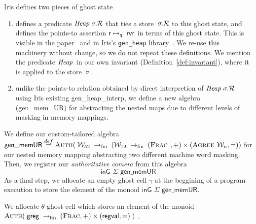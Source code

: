 \begin{assumption}
\label{assumption}
Iris defines two pieces of ghost state
\begin{enumerate}
\item  defines a predicate $\mathit{Heap}\;\sigma.\mathcal{R}$
  that ties a store~$\sigma.\mathcal{R}$ to this ghost state,
  and defines the points-to assertion $\mathsf{r}\mapsto_{\mathsf{q}}\;\mathsf{rv}\mathsf{r}$
  in terms of this ghost state.
  This is visible in the paper~\cite[\S6.3.2]{iris}
  and in Iris's \texttt{gen\_heap} library~\cite{genheap}.
  We re-use this machinery without change,
  so we do not repeat these definitions.
  We mention the predicate $\mathit{Heap}\;\!$
  in our own invariant (Definition~\ref{def:invariant}),
  where it is applied to the \logical store~$\sigma$.
\item unlike the points-to relation obtained by direct interpretion of $\mathit{Heap}\;\sigma.\mathcal{R}$ using Iris existing \textsf{gen\_heap\_interp},
  we define a new algebra (\textsf{gen\_mem\_UR}) for abstracting the nested maps due to different levels of masking in memory mappings. 
\end{enumerate}
\end{assumption}

\begin{definition}
We define our custom-tailored algebra 
\newcommand\fpfn{\rightarrow_{\textrm{fin}}}
\( \textsf{gen\_memUR} \stackrel{def}{=}
  \authm(\;
  \Locft \;\fpfn\;
  (\Loctw \;\fpfn\;  (\textsc{Frac }, \mathord{+}) \times (\textsc{Agree } \Loc,\mathord{=}) )
  \)
  for our nested memory mapping abstracting two different machine word masking. Then, we register our \emph{authoritative camera} \cite[\S6.3.3]{iris} from this algebra
\[\textsf{inG } \Sigma \textsf{ gen\_memUR} \]
As a final step, we allocate an empty ghost cell $\gamma$ at the beggining of a program execution to store the element of the monoid $\textsf{inG } \Sigma \textsf{ gen\_memUR}$.
\end{definition}

\begin{definition}
We allocate $\theta$ ghost cell which stores an
element of the monoid 
\newcommand\fpfn{\rightarrow_{\textrm{fin}}}
\(
  \authm(\;
    \regset \;\fpfn\;
    (\textsc{Frac}, \mathord{+})
    \times
    (\regvaltype, \mathord{=})
  \;)
\)
\cite[\S6.3.3]{iris}.
\end{definition}


